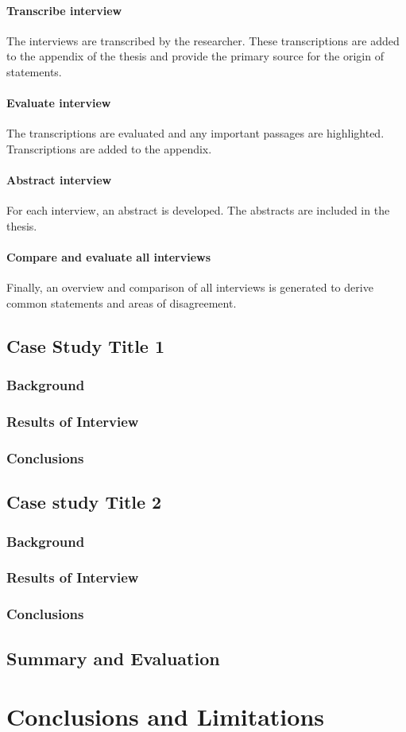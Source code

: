 \documentclass[  12pt,
titlepage,
parskip,
draft=false,
headsepline=true,
footsepline=true,
captions=tableheading]{scrartcl}
\begin{document}
\paragraph{Transcribe interview} The interviews are transcribed by the researcher. These transcriptions are added to the appendix of the thesis and provide the primary source for the origin of statements.

\paragraph{Evaluate interview} The transcriptions are evaluated and any important passages are highlighted. Transcriptions are added to the appendix.

\paragraph{Abstract interview} For each interview, an abstract is developed. The abstracts are included in the thesis.

\paragraph{Compare and evaluate all interviews} Finally, an overview and comparison of all interviews is generated to derive common statements and areas of disagreement.


\subsection{Case Study Title 1}

\subsubsection{Background}
\subsubsection{Results of Interview}
\subsubsection{Conclusions}
\subsection{Case study Title 2}
\subsubsection{Background}
\subsubsection{Results of Interview}
\subsubsection{Conclusions}


\subsection{Summary and Evaluation}

\newpage
\section{Conclusions and Limitations}

\clearpage
{}
\label{Ref}
\printbibliography
\end{document}
